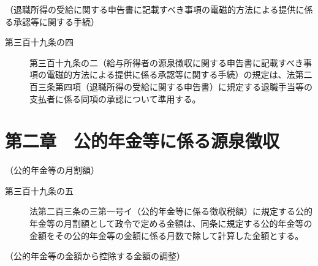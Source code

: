 \documentclass[twocolumn,a4j,10pt]{ltjtarticle}
\begin{document}
\noindent\hspace{10pt}（退職所得の受給に関する申告書に記載すべき事項の電磁的方法による提供に係る承認等に関する手続）
\begin{description}
\item[第三百十九条の四]第三百十九条の二（給与所得者の源泉徴収に関する申告書に記載すべき事項の電磁的方法による提供に係る承認等に関する手続）の規定は、法第二百三条第四項（退職所得の受給に関する申告書）に規定する退職手当等の支払者に係る同項の承認について準用する。
\end{description}
\section*{第二章　公的年金等に係る源泉徴収}
\noindent\hspace{10pt}（公的年金等の月割額）
\begin{description}
\item[第三百十九条の五]法第二百三条の三第一号イ（公的年金等に係る徴収税額）に規定する公的年金等の月割額として政令で定める金額は、同条に規定する公的年金等の金額をその公的年金等の金額に係る月数で除して計算した金額とする。
\end{description}
\noindent\hspace{10pt}（公的年金等の金額から控除する金額の調整）
\end{document}
